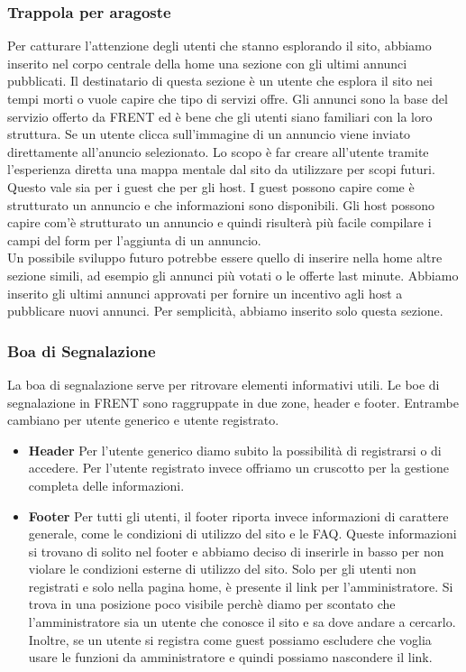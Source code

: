 \documentclass[1_relazione.tex]{subfiles}
\begin{document}
\subsubsection{Trappola per aragoste} 
Per catturare l'attenzione degli utenti che stanno esplorando il sito, abbiamo inserito nel corpo centrale della home una sezione con gli ultimi annunci pubblicati. Il destinatario di questa sezione è un utente che esplora il sito nei tempi morti o vuole capire che tipo di servizi offre. Gli annunci sono la base del servizio offerto da FRENT ed è bene che gli utenti siano familiari con la loro struttura. Se un utente clicca sull'immagine di un annuncio viene inviato direttamente all'anuncio selezionato. Lo scopo è far creare all'utente tramite l'esperienza diretta una mappa mentale dal sito da utilizzare per scopi futuri. \\
Questo vale sia per i guest che per gli host. I guest possono capire come è strutturato un annuncio e che informazioni sono disponibili. Gli host possono capire com'è strutturato un annuncio e quindi risulterà più facile compilare i campi del form per l'aggiunta di un annuncio. \\
Un possibile sviluppo futuro potrebbe essere quello di inserire nella home altre sezione simili, ad esempio gli annunci più votati o le offerte last minute. Abbiamo inserito gli ultimi annunci approvati per fornire un incentivo agli host a pubblicare nuovi annunci. Per semplicità, abbiamo inserito solo questa sezione. \\

\subsubsection{Boa di Segnalazione}
La boa di segnalazione serve per ritrovare elementi informativi utili. Le boe di segnalazione in FRENT sono raggruppate in due zone, header e footer. Entrambe cambiano per utente generico e utente registrato.

\begin{itemize}
\item \textbf{Header}
Per l'utente generico diamo subito la possibilità di registrarsi o di accedere. Per l'utente registrato invece offriamo un cruscotto per la gestione completa delle informazioni. 
\item \textbf{Footer}
Per tutti gli utenti, il footer riporta invece informazioni di carattere generale, come le condizioni di utilizzo del sito e le FAQ. Queste informazioni si trovano di solito nel footer e abbiamo deciso di inserirle in basso per non violare le condizioni esterne di utilizzo del sito.  Solo per gli utenti non registrati e solo nella pagina home, è presente il link per l'amministratore. Si trova in una posizione poco visibile perchè diamo per scontato che l'amministratore sia un utente che conosce il sito e sa dove andare a cercarlo. Inoltre, se un utente si registra come guest possiamo escludere che voglia usare le funzioni da amministratore e quindi possiamo nascondere il link. 
\end{itemize}
\end{document}

